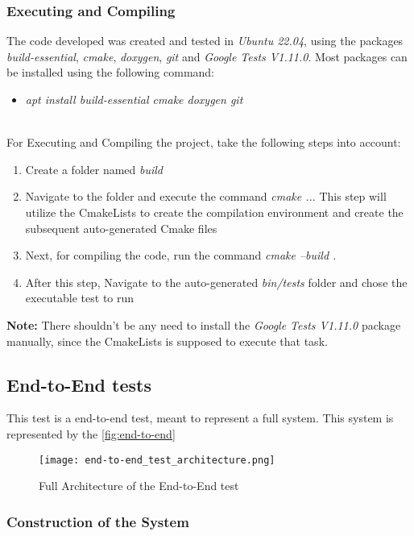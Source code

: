 \begin{refsection}
\subsubsection{Executing and Compiling}
\label{arc:execComp}
The code developed was created and tested in \textit{Ubuntu 22.04}, using the 
packages \textit{build-essential}, \textit{cmake}, \textit{doxygen}, 
\textit{git} and \textit{Google Tests V1.11.0}.
Most packages can be installed using the following command:
\\
\begin{itemize}
	\item \textit{apt install build-essential cmake doxygen git}
\end{itemize}
\\
For Executing and Compiling the project, take the following steps into account:
\begin{enumerate}
	\item Create a folder named \textit{build}
	\item Navigate to the folder and execute the command \textit{cmake ..}. 
		This step will utilize the CmakeLists to create the compilation 
		environment and create the subsequent auto-generated Cmake files
	\item Next, for compiling the code, run the command 
		\textit{cmake --build .}
	\item After this step, Navigate to the auto-generated \textit{bin/tests} folder
		and chose the executable test to run
\end{enumerate}

\textbf{Note:} There shouldn't be any need to install the \textit{Google Tests V1.11.0} 
package manually, since the CmakeLists is supposed to execute that task.

\subsection{End-to-End tests}

This test is a end-to-end test, meant to represent a full system. This system is represented 
by the \autoref{fig:end-to-end}

\begin{figure}[!b]
	\centering
	\texttt{[image: end-to-end\_test\_architecture.png]}
	\caption{Full Architecture of the End-to-End test}
	\label{fig:end-to-end}
\end{figure}

\subsubsection{Construction of the System}


\end{refsection}
